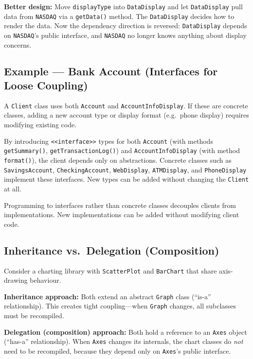 \documentclass[11pt, a4paper, notitlepage]{report}
\theoremstyle{definition}
\theoremstyle{remark}
\theoremstyle{definition}
\begin{document}
\textbf{Better design:} Move \texttt{displayType} into \texttt{DataDisplay} and let
\texttt{DataDisplay} pull data from \texttt{NASDAQ} via a \texttt{getData()} method. The
\texttt{DataDisplay} decides how to render the data. Now the dependency direction is reversed:
\texttt{DataDisplay} depends on \texttt{NASDAQ}'s public interface, and \texttt{NASDAQ} no
longer knows anything about display concerns.

\subsection{Example --- Bank Account (Interfaces for Loose Coupling)}
\label{subsec:ch9-bank-account}

A \texttt{Client} class uses both \texttt{Account} and \texttt{AccountInfoDisplay}. If these
are concrete classes, adding a new account type or display format (e.g.\ phone display) requires
modifying existing code.

By introducing \texttt{<<interface>>} types for both \texttt{Account} (with methods
\texttt{getSummary()}, \texttt{getTransactionLog()}) and \texttt{AccountInfoDisplay} (with
method \texttt{format()}), the client depends only on abstractions. Concrete classes such as
\texttt{SavingsAccount}, \texttt{CheckingAccount}, \texttt{WebDisplay}, \texttt{ATMDisplay},
and \texttt{PhoneDisplay} implement these interfaces. New types can be added without changing
the \texttt{Client} at all.

\begin{keyresult}[title={Key Result: Interfaces Promote Loose Coupling}]
  Programming to interfaces rather than concrete classes decouples clients from
  implementations. New implementations can be added without modifying client code.
\end{keyresult}

\subsection{Inheritance vs.\ Delegation (Composition)}
\label{subsec:ch9-inherit-vs-delegation}

Consider a charting library with \texttt{ScatterPlot} and \texttt{BarChart} that share
axis-drawing behaviour.

\textbf{Inheritance approach:} Both extend an abstract \texttt{Graph} class (``is-a''
relationship). This creates tight coupling---when \texttt{Graph} changes, all subclasses must
be recompiled.

\textbf{Delegation (composition) approach:} Both hold a reference to an \texttt{Axes} object
(``has-a'' relationship). When \texttt{Axes} changes its internals, the chart classes do
\emph{not} need to be recompiled, because they depend only on \texttt{Axes}'s public interface.
\end{document}
